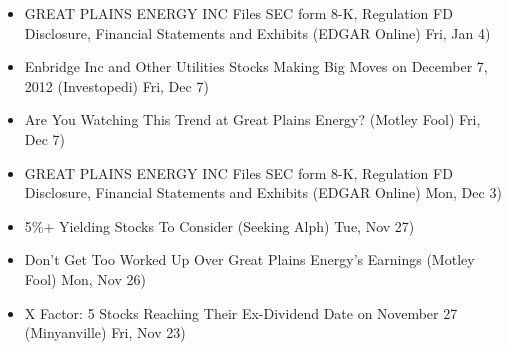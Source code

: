 \documentclass[11pt,asymmetric]{article}
\begin{document}
\begin{itemize}
\item GREAT PLAINS ENERGY INC Files SEC form 8-K, Regulation FD Disclosure, Financial Statements and Exhibits (EDGAR Online) Fri, Jan 4)
\item Enbridge Inc and Other Utilities Stocks Making Big Moves on December 7, 2012 (Investopedi) Fri, Dec 7)
\item Are You Watching This Trend at Great Plains Energy? (Motley Fool) Fri, Dec 7)
\item GREAT PLAINS ENERGY INC Files SEC form 8-K, Regulation FD Disclosure, Financial Statements and Exhibits (EDGAR Online) Mon, Dec 3)
\item 5\%+ Yielding Stocks To Consider (Seeking Alph) Tue, Nov 27)
\item Don't Get Too Worked Up Over Great Plains Energy's Earnings (Motley Fool) Mon, Nov 26)
\item X Factor: 5 Stocks Reaching Their Ex-Dividend Date on November 27 (Minyanville) Fri, Nov 23)
\end{itemize}
\end{document}

